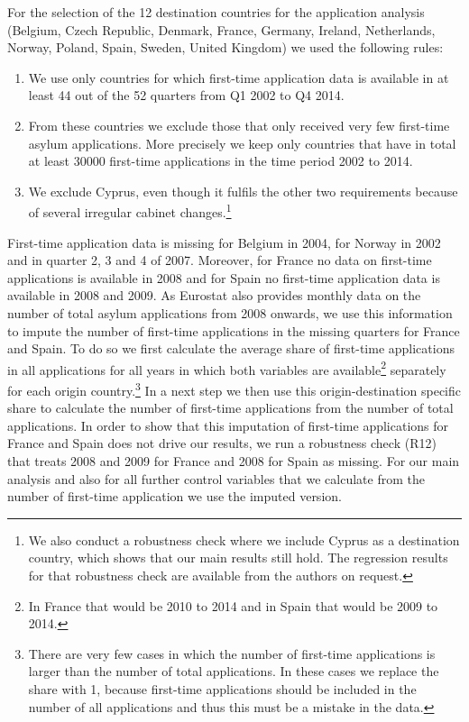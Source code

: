\documentclass[11pt,a4paper]{scrartcl}
\begin{document}
For the selection of the 12 destination countries for the application analysis (Belgium, Czech Republic, Denmark, France, Germany, Ireland, Netherlands, Norway, Poland, Spain, Sweden, United Kingdom) we used the following rules:
\begin{enumerate}
	\itemsep-0.2em
	\item We use only countries for which first-time application data is available in at least 44 out of the 52 quarters from Q1 2002 to Q4 2014.
	\item From these countries we exclude those that only received very few first-time asylum applications. More precisely we keep only countries that have in total at least 30000 first-time applications in the time period 2002 to 2014.
	\item We exclude Cyprus, even though it fulfils the other two requirements because of several irregular cabinet changes.\footnote{We also conduct a robustness check where we include Cyprus as a destination country, which shows that our main results still hold. The regression results for that robustness check are available from the authors on request.}
\end{enumerate}   

First-time application data is missing for Belgium in 2004, for Norway in 2002 and in quarter 2, 3 and 4 of 2007. Moreover, for France no data on first-time applications is available in 2008 and for Spain no first-time application data is available in 2008 and 2009. As Eurostat also provides monthly data on the number of total asylum applications from 2008 onwards, we use this information to impute the number of first-time applications in the missing quarters for France and Spain. To do so we first calculate the average share of first-time applications in all applications for all years in which both variables are available\footnote{In France that would be 2010 to 2014 and in Spain that would be 2009 to 2014.} separately for each origin country.\footnote{There are very few cases in which the number of first-time applications is larger than the number of total applications. In these cases we replace the share with 1, because first-time applications should be included in the number of all applications and thus this must be a mistake in the data.} In a next step we then use this origin-destination specific share to calculate the number of first-time applications from the number of total applications. In order to show that this imputation of first-time applications for France and Spain does not drive our results, we run a robustness check (R12) that treats 2008 and 2009 for France and 2008 for Spain as missing. For our main analysis and also for all further control variables that we calculate from the number of first-time application we use the imputed version.
\end{document}
